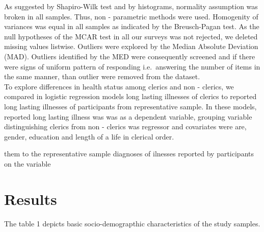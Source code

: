 \documentclass[ijerph,article,accept,moreauthors,pdftex]{mdpi}
\begin{document}
As suggested by Shapiro-Wilk test and by histograms, normality
assumption was broken in all samples. Thus, non - parametric methods
were used. Homogenity of variances was equal in all samples as indicated
by the Breusch-Pagan test. As the null hypotheses of the MCAR test in
all our surveys was not rejected, we deleted missing values listwise.
Outliers were explored by the Median Absolute Deviation (MAD). Outliers
identified by the MED were consequently screened and if there were signs
of uniform pattern of responding i.e.~answering the number of items in
the same manner, than outlier were removed from the dataset.\\
To explore differences in health status among clerics and non - clerics,
we compared in logistic regression models long lasting illnesses of
clerics to reported long lasting illnesses of participants from
representative sample. In these models, reported long lasting illness
was was as a dependent variable, grouping variable distinguishing
clerics from non - clerics was regressor and covariates were are,
gender, education and length of a life in clerical order.

them to the representative sample diagnoses of ilnesses reported by
participants on the variable

\hypertarget{results}{%
\section{Results}\label{results}}

The table 1 depicts basic socio-demograpthic characteristics of the
study samples.

\newpage
\end{document}
